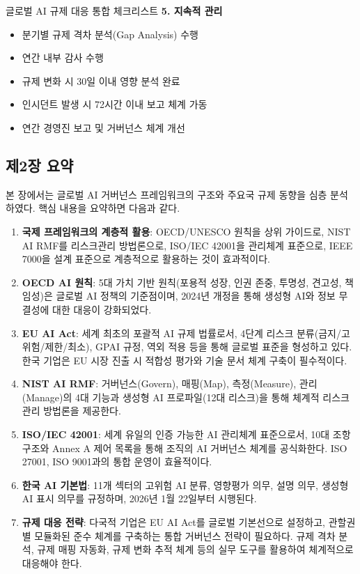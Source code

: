 \begin{practicaltool}{글로벌 AI 규제 대응 통합 체크리스트}
\textbf{5. 지속적 관리}
\begin{itemize}
 \item[$\square$] 분기별 규제 격차 분석(Gap Analysis) 수행
 \item[$\square$] 연간 내부 감사 수행
 \item[$\square$] 규제 변화 시 30일 이내 영향 분석 완료
 \item[$\square$] 인시던트 발생 시 72시간 이내 보고 체계 가동
 \item[$\square$] 연간 경영진 보고 및 거버넌스 체계 개선
\end{itemize}
\end{practicaltool}

\subsection*{제2장 요약}

본 장에서는 글로벌 AI 거버넌스 프레임워크의 구조와 주요국 규제 동향을 심층 분석하였다. 핵심 내용을 요약하면 다음과 같다.

\begin{enumerate}
 \item \textbf{국제 프레임워크의 계층적 활용}: OECD/UNESCO 원칙을 상위 가이드로, NIST AI RMF를 리스크관리 방법론으로, ISO/IEC 42001을 관리체계 표준으로, IEEE 7000을 설계 표준으로 계층적으로 활용하는 것이 효과적이다.

 \item \textbf{OECD AI 원칙}: 5대 가치 기반 원칙(포용적 성장, 인권 존중, 투명성, 견고성, 책임성)은 글로벌 AI 정책의 기준점이며, 2024년 개정을 통해 생성형 AI와 정보 무결성에 대한 대응이 강화되었다.

 \item \textbf{EU AI Act}: 세계 최초의 포괄적 AI 규제 법률로서, 4단계 리스크 분류(금지/고위험/제한/최소), GPAI 규정, 역외 적용 등을 통해 글로벌 표준을 형성하고 있다. 한국 기업은 EU 시장 진출 시 적합성 평가와 기술 문서 체계 구축이 필수적이다.

 \item \textbf{NIST AI RMF}: 거버넌스(Govern), 매핑(Map), 측정(Measure), 관리(Manage)의 4대 기능과 생성형 AI 프로파일(12대 리스크)을 통해 체계적 리스크관리 방법론을 제공한다.

 \item \textbf{ISO/IEC 42001}: 세계 유일의 인증 가능한 AI 관리체계 표준으로서, 10대 조항 구조와 Annex A 제어 목록을 통해 조직의 AI 거버넌스 체계를 공식화한다. ISO 27001, ISO 9001과의 통합 운영이 효율적이다.

 \item \textbf{한국 AI 기본법}: 11개 섹터의 고위험 AI 분류, 영향평가 의무, 설명 의무, 생성형 AI 표시 의무를 규정하며, 2026년 1월 22일부터 시행된다.

 \item \textbf{규제 대응 전략}: 다국적 기업은 EU AI Act를 글로벌 기본선으로 설정하고, 관할권별 모듈화된 준수 체계를 구축하는 통합 거버넌스 전략이 필요하다. 규제 격차 분석, 규제 매핑 자동화, 규제 변화 추적 체계 등의 실무 도구를 활용하여 체계적으로 대응해야 한다.
\end{enumerate}
